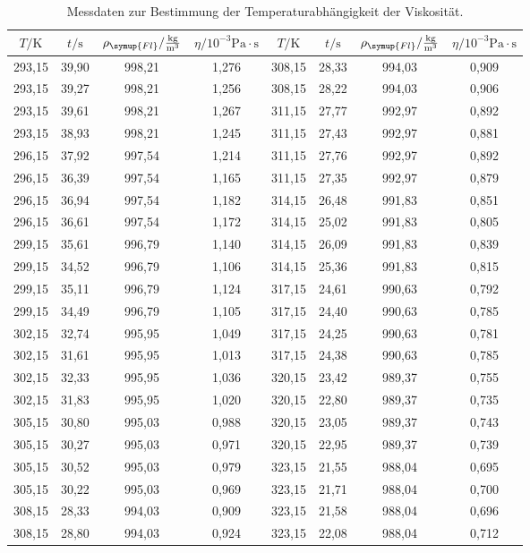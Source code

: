 \begin{table}
  \centering
  \caption{Messdaten zur Bestimmung der Temperaturabhängigkeit der Viskosität.}
  \label{tab:Temp}
  \begin{tabular}{c c c c | c c c c}
    \toprule
    $T/\unit{\kelvin}$ & $t/\unit{\second}$ & $\rho_{\symup{Fl}}/\frac{\unit{\kilo\gram}}{\unit{\meter^3}}$ & $\eta/10^{-3}\unit{\pascal}\cdot \unit{\second}$ & $T/\unit{\kelvin}$ & $t/\unit{\second}$ & $\rho_{\symup{Fl}}/\frac{\unit{\kilo\gram}}{\unit{\meter^3}}$ & $\eta/10^{-3}\unit{\pascal}\cdot \unit{\second}$ \\
    \midrule
    293,15 & 39,90 & 998,21 & 1,276 & 308,15 & 28,33 & 994,03 & 0,909 \\
    293,15 & 39,27 & 998,21 & 1,256 & 308,15 & 28,22 & 994,03 & 0,906 \\
    293,15 & 39,61 & 998,21 & 1,267 & 311,15 & 27,77 & 992,97 & 0,892 \\
    293,15 & 38,93 & 998,21 & 1,245 & 311,15 & 27,43 & 992,97 & 0,881 \\
    296,15 & 37,92 & 997,54 & 1,214 & 311,15 & 27,76 & 992,97 & 0,892 \\
    296,15 & 36,39 & 997,54 & 1,165 & 311,15 & 27,35 & 992,97 & 0,879 \\
    296,15 & 36,94 & 997,54 & 1,182 & 314,15 & 26,48 & 991,83 & 0,851 \\
    296,15 & 36,61 & 997,54 & 1,172 & 314,15 & 25,02 & 991,83 & 0,805 \\
    299,15 & 35,61 & 996,79 & 1,140 & 314,15 & 26,09 & 991,83 & 0,839 \\
    299,15 & 34,52 & 996,79 & 1,106 & 314,15 & 25,36 & 991,83 & 0,815 \\
    299,15 & 35,11 & 996,79 & 1,124 & 317,15 & 24,61 & 990,63 & 0,792 \\
    299,15 & 34,49 & 996,79 & 1,105 & 317,15 & 24,40 & 990,63 & 0,785 \\
    302,15 & 32,74 & 995,95 & 1,049 & 317,15 & 24,25 & 990,63 & 0,781 \\
    302,15 & 31,61 & 995,95 & 1,013 & 317,15 & 24,38 & 990,63 & 0,785 \\
    302,15 & 32,33 & 995,95 & 1,036 & 320,15 & 23,42 & 989,37 & 0,755 \\
    302,15 & 31,83 & 995,95 & 1,020 & 320,15 & 22,80 & 989,37 & 0,735 \\
    305,15 & 30,80 & 995,03 & 0,988 & 320,15 & 23,05 & 989,37 & 0,743 \\
    305,15 & 30,27 & 995,03 & 0,971 & 320,15 & 22,95 & 989,37 & 0,739 \\
    305,15 & 30,52 & 995,03 & 0,979 & 323,15 & 21,55 & 988,04 & 0,695 \\
    305,15 & 30,22 & 995,03 & 0,969 & 323,15 & 21,71 & 988,04 & 0,700 \\
    308,15 & 28,33 & 994,03 & 0,909 & 323,15 & 21,58 & 988,04 & 0,696 \\
    308,15 & 28,80 & 994,03 & 0,924 & 323,15 & 22,08 & 988,04 & 0,712 \\
    \bottomrule
  \end{tabular}
\end{table}

